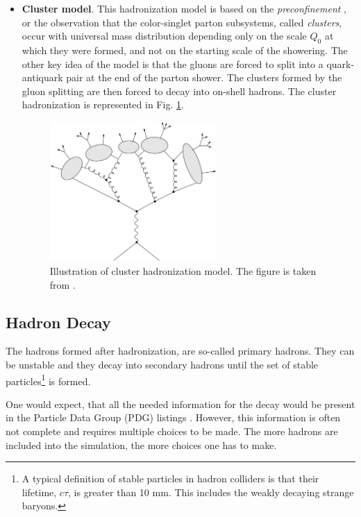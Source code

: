 \begin{itemize}
 \item \textbf{Cluster model}. This hadronization model is based on the \textit{preconfinement} \cite{Amati:1979fg}, or the
 observation that the color-singlet parton subsystems, called \textit{clusters}, occur with universal mass distribution
 depending only on the scale $Q_{0}$ at which they were formed, and not on the starting scale of the showering.
 The other key idea of the model is that the gluons are forced to split into a quark-antiquark pair at the end of the parton shower.
 The clusters formed by the gluon splitting are then forced to decay into on-shell hadrons. The cluster hadronization is represented 
 in Fig. \ref{fig:clustHad}.
 
 \begin{figure}[h]
  \centering
  \includegraphics[width=0.6\textwidth]{03_simulation/plots/Figures_MonteCarlo_clustr_had.png}
  \caption{Illustration of cluster hadronization model. The figure is taken from \cite{Webber:1999ui}.}
  \label{fig:clustHad}
 \end{figure} 
 
\end{itemize}

\subsection{Hadron Decay}

The hadrons formed after hadronization, are so-called primary hadrons. They can be unstable and they decay into secondary hadrons
until the set of stable particles\footnote{A typical definition of stable particles in hadron colliders is that their
lifetime, $c\tau$, is greater than 10 mm. This includes the weakly decaying strange baryons.} is formed.

One would expect, that all the needed information for the decay would be present in the Particle Data Group (PDG) listings \cite{PDG-2012}.
However, this information is often not complete and requires multiple choices to be made. The more hadrons are included into the simulation,
the more choices one has to make.

